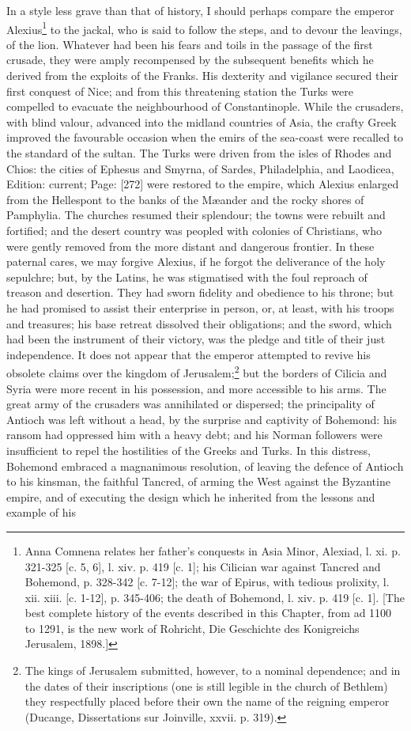 In a style less grave than that of history, I should perhaps compare the emperor Alexius\footnote{Anna Comnena relates her father\texthebrew{}’s conquests in Asia Minor, Alexiad, l. xi. p. 321-325 [c. 5, 6], l. xiv. p. 419 [c. 1]; his Cilician war against Tancred and Bohemond, p. 328-342 [c. 7-12]; the war of Epirus, with tedious prolixity, l. xii. xiii. [c. 1-12], p. 345-406; the death of Bohemond, l. xiv. p. 419 [c. 1]. [The best complete history of the events described in this Chapter, from ad 1100 to 1291, is the new work of Rohricht, Die Geschichte des Konigreichs Jerusalem, 1898.]} to the jackal, who is said to follow the steps, and to devour the leavings, of the lion. Whatever had been his fears and toils in the passage of the first crusade, they were amply recompensed by the subsequent benefits which he derived from the exploits of the Franks. His dexterity and vigilance secured their first conquest of Nice; and from this threatening station the Turks were compelled to evacuate the neighbourhood of Constantinople. While the crusaders, with blind valour, advanced into the midland countries of Asia, the crafty Greek improved the favourable occasion when the emirs of the sea-coast were recalled to the standard of the sultan. The Turks were driven from the isles of Rhodes and Chios: the cities of Ephesus and Smyrna, of Sardes, Philadelphia, and Laodicea, Edition: current; Page: [272] were restored to the empire, which Alexius enlarged from the Hellespont to the banks of the Mæander and the rocky shores of Pamphylia. The churches resumed their splendour; the towns were rebuilt and fortified; and the desert country was peopled with colonies of Christians, who were gently removed from the more distant and dangerous frontier. In these paternal cares, we may forgive Alexius, if he forgot the deliverance of the holy sepulchre; but, by the Latins, he was stigmatised with the foul reproach of treason and desertion. They had sworn fidelity and obedience to his throne; but he had promised to assist their enterprise in person, or, at least, with his troops and treasures; his base retreat dissolved their obligations; and the sword, which had been the instrument of their victory, was the pledge and title of their just independence. It does not appear that the emperor attempted to revive his obsolete claims over the kingdom of Jerusalem;\footnote{The kings of Jerusalem submitted, however, to a nominal dependence; and in the dates of their inscriptions (one is still legible in the church of Bethlem) they respectfully placed before their own the name of the reigning emperor (Ducange, Dissertations sur Joinville, xxvii. p. 319).} but the borders of Cilicia and Syria were more recent in his possession, and more accessible to his arms. The great army of the crusaders was annihilated or dispersed; the principality of Antioch was left without a head, by the surprise and captivity of Bohemond: his ransom had oppressed him with a heavy debt; and his Norman followers were insufficient to repel the hostilities of the Greeks and Turks. In this distress, Bohemond embraced a magnanimous resolution, of leaving the defence of Antioch to his kinsman, the faithful Tancred, of arming the West against the Byzantine empire, and of executing the design which he inherited from the lessons and example of his 